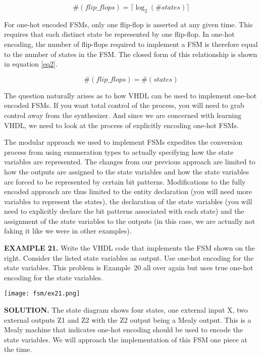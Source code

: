 \begin{equation}\label{eq1}
 \#(flip\_flops) = \lceil \log_2(\#states) \rceil
\end{equation}

For one-hot encoded FSMs, only one flip-flop is asserted at any given time. This requires that each distinct state be represented by one flip-flop. In one-hot encoding, the number of flip-flops required to implement a FSM is therefore equal to the number of states in the FSM. The closed form of this relationship is shown in equation \ref{eq2}. 

\begin{equation}\label{eq2}
 \#(flip\_flops) = \#(states)
\end{equation}

The question naturally arises as to how VHDL can be used to implement one-hot encoded FSMs. If you want total control of the process, you will need to grab control away from the synthesizer. And since we are concerned with learning VHDL, we need to look at the process of explicitly encoding one-hot FSMs. 

The modular approach we used to implement FSMs expedites the conversion process from using enumeration types to actually specifying how the state variables are represented. The changes from our previous approach are limited to how the outputs are assigned to the state variables and how the state variables are forced to be represented by certain bit patterns. Modifications to the fully encoded approach are thus limited to the entity declaration (you will need more variables to represent the states), the declaration of the state variables (you will need to explicitly declare the bit patterns associated with each state) and the assignment of the state variables to the outputs (in this case, we are actually not faking it like we were in other examples). 

\begin{leftbar}
\begin{minipage}[t]{0.5\textwidth}
\vspace{10pt}
\noindent
\textbf{EXAMPLE 21.}
Write the VHDL code that implements the FSM shown on the right. Consider the listed state variables as output. Use one-hot encoding for the state variables. This problem is Example~20 all over again but uses true one-hot encoding for the state variables. 
\vspace{50px}
\end{minipage}
\begin{minipage}[t]{0.47\textwidth}
\vspace{0pt}\raggedright
    \centering
	\texttt{[image: fsm/ex21.png]}
\end{minipage}
\end{leftbar}
\noindent
\textbf{SOLUTION.} The state diagram shows four states, one external input X, two external outputs Z1 and Z2 with the Z2 output being a Mealy output. This is a Mealy machine that indicates one-hot encoding should be used to encode the state variables. We will approach the implementation of this FSM one piece at the time.


